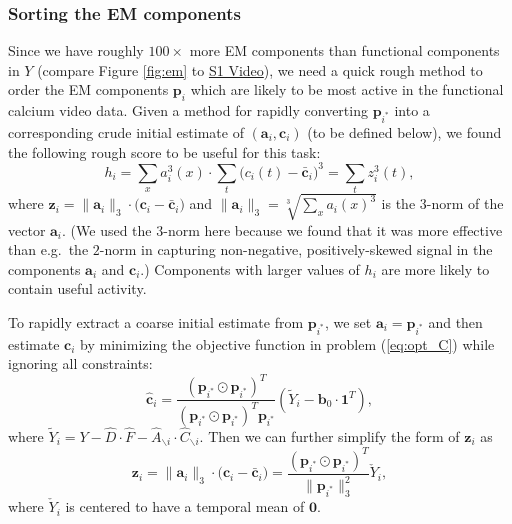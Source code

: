 \documentclass[10pt,letterpaper]{article}
\def \videoOneURL{https://www.dropbox.com/s/0ph27nsx5fxcc1b/demixing_scan_1_201_9100.avi?dl=0}
\begin{document}
{\subsubsection{Sorting the EM components}
Since we have roughly $100\times$ more EM components than functional components in $Y$ (compare Figure \ref{fig:em} to \href{\videoOneURL}{S1 Video}), we need a quick rough method to order the EM components $\bm{p}_i$ which are likely to be most active in the functional calcium video data.  Given a method for rapidly converting $\bm{p}_{i^*}$ into a corresponding crude initial estimate of $(\bm{a}_i,\bm{c}_i)$ (to be defined below), we found the following rough score to be useful for this task:
\begin{equation}
     h_i = %
     \sum_{x}{a}_i^3(x)\cdot \sum_t\big({c}_i(t)-\bar{\bm{c}}_i\big)^3= \sum_t z_i^3(t),  \label{eq:hi}
\end{equation}
where $\bm{z}_i =\|{\bm{a}}_i\|_3\cdot \big(\bm{c}_i-\bar{\bm{c}}_i\big)$ and $\|\bm{a}_i\|_3 = \sqrt[3]{\sum_x a_i(x)^3}$ is the $3$-norm of the vector $\bm{a}_i$.  (We used the $3$-norm here because we found that it was more effective than e.g.~the $2$-norm in capturing non-negative, positively-skewed signal in the components $\bm{a}_i$ and $\bm{c}_i$.)  Components with larger values of $h_i$ are more likely to contain useful activity. 

To rapidly extract a coarse initial estimate from $\bm{p}_{i^*}$, we set $\bm{a}_i =\bm{p}_{i^*}$ and then estimate $\bm{c}_i$ by minimizing the objective function in problem (\ref{eq:opt_C}) while ignoring all constraints:
\begin{equation}
	\hat{\bm{c}}_i = \frac{(\bm{p}_{i^*}\odot \bm{p}_{i^*})^T}{(\bm{p}_{i^*}\odot \bm{p}_{i^*})^T\bm{p}_{i^*}}(\tilde{Y}_i-\bm{b}_0\cdot \bm{1}^T), \label{eq:ci}
\end{equation}
where $\tilde{Y}_i = Y-\hat{D}\cdot \hat{F} - \hat{A}_{\backslash i}\cdot \hat{C}_{\backslash i}$. Then we can further simplify the form of $\bm{z}_i$ as 
\begin{equation}
    \bm{z}_i =\|{\bm{a}}_i\|_3\cdot \big({\bm{c}}_i-\bar{\bm{c}}_i\big) = \frac{(\bm{p}_{i^*}\odot \bm{p}_{i^*})^T}{\|\bm{p}_{i^*}\|_3^2}\check{Y}_i,
\end{equation}
where $\check{Y}_i$ is centered to have a temporal mean of $\bm{0}$. 


}
\end{document}
